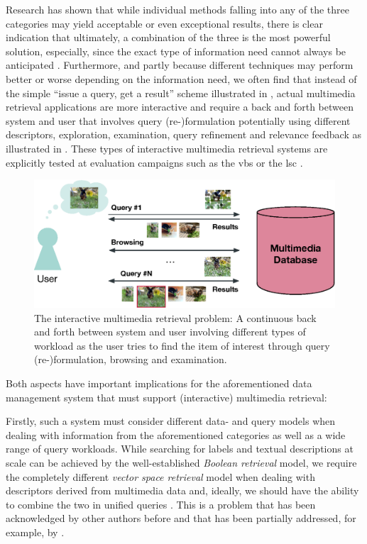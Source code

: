 Research has shown that while individual methods falling into any of the three categories may yield acceptable or even exceptional results, there is clear indication that ultimately, a combination of the three is the most powerful solution, especially, since the exact type of information need cannot always be anticipated \cite{Rossetto:2020Interactive}. Furthermore, and partly because different techniques may perform better or worse depending on the information need, we often find that instead of the simple ``issue a query, get a result'' scheme illustrated in , actual multimedia retrieval applications are more interactive and require a back and forth between system and user \cite{Lokovc:2022Task} that involves query (re-)formulation potentially using different descriptors, exploration, examination, query refinement and relevance feedback \cite{Lokovc:2019Interactive,Gurrin:2019Invited} as illustrated in . These types of interactive multimedia retrieval systems are explicitly tested at evaluation campaigns such as the \acrfull{vbs} \cite{Schoeffmann:2019Video} or the \acrfull{lsc} \cite{Gurrin:2021Introduction}.

\begin{figure}[tb]
    \centering
    \includegraphics[width=\textwidth]{figures/mr-actual.eps}
    \caption{The interactive multimedia retrieval problem: A continuous back and forth between system and user involving different types of workload as the user tries to find the item of interest through query (re-)formulation, browsing and examination.}
    \label{figure:mr-actual}
\end{figure}
 
Both aspects have important implications for the aforementioned data management system that must support (interactive) multimedia retrieval:

Firstly, such a system must consider different data- and query models when dealing with information from the aforementioned categories as well as a wide range of query workloads. While searching for labels and textual descriptions at scale can be achieved by the well-established \emph{Boolean retrieval} model, we require the completely different \emph{vector space retrieval} model when dealing with descriptors derived from multimedia data and, ideally, we should have the ability to combine the two in unified queries \cite{Heller:2020Multi}. This is a problem that has been acknowledged by other authors before \cite{Jonson:2016} and that has been partially addressed, for example, by \cite{Giangreco:2018Database,Giangreco:2016adam,Wang:2021Milvus}.

